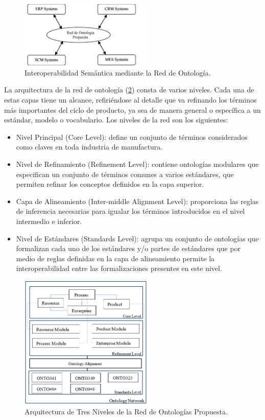 \documentclass[journal]{IEEEtran}
\begin{document}
\begin{figure}[!t]
\centering
\includegraphics[width=2.5in]{figures/figure1.png}
\caption{Interoperabilidad Sem\'antica mediante la Red de Ontolog\'ia.}
\label{fig1}
\end{figure}

La arquitectura de la red de ontolog\'ia (\ref{fig2}) consta de varios niveles. Cada una de estas capas tiene un alcance, refiri\'endose al detalle que va refinando los t\'erminos m\'as importantes del ciclo de producto, ya sea de manera general o espec\'ifica a un est\'andar, modelo o vocabulario. Los niveles de la red son los siguientes:

\begin{itemize}
    \item Nivel Principal (Core Level): define un conjunto de t\'erminos considerados como claves en toda industria de manufactura.
    \item Nivel de Refinamiento (Refinement Level): contiene ontolog\'ias modulares que especifican un conjunto de t\'erminos comunes a varios est\'andares, que permiten refinar los conceptos definidos en la capa superior.
    \item Capa de Alineamiento (Inter-middle Alignment Level): proporciona las reglas de inferencia necesarias para igualar los t\'erminos introducidos en el nivel intermedio e inferior.
    \item Nivel de Est\'andares (Standards Level): agrupa un conjunto de ontolog\'ias que formalizan cada uno de los est\'andares y/o partes de est\'andares que por medio de reglas definidas en la capa de alineamiento permite la interoperabilidad entre las formalizaciones presentes en este nivel.  
\end{itemize}



\begin{figure}[!t]
\centering
\includegraphics[width=2.5in]{figures/figure2.png}
\caption{Arquitectura de Tres Niveles de la Red de Ontolog\'ias Propuesta.}
\label{fig2}
\end{figure}
\end{document}
